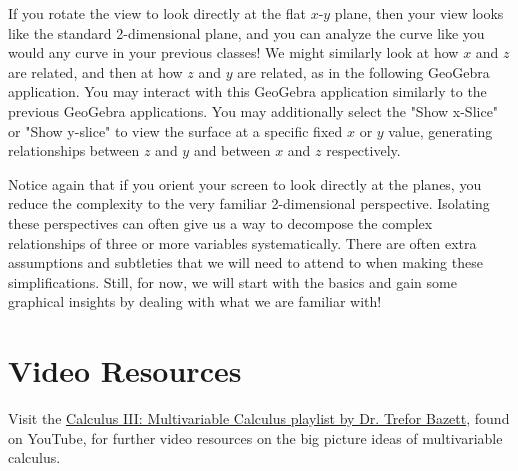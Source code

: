 \documentclass{ximera}
\begin{document}
\begin{center}
\end{center}

If you rotate the view to look directly at the flat $x$-$y$ plane, then your view looks like the standard 2-dimensional plane, and you can analyze the curve like you would any curve in your previous classes! We might similarly look at how $x$ and $z$ are related, and then at how $z$ and $y$ are related, as in the following GeoGebra application. You may interact with this GeoGebra application similarly to the previous GeoGebra applications. You may additionally select the "Show x-Slice" or "Show y-slice" to view the surface at a specific fixed $x$ or $y$ value, generating relationships between $z$ and $y$ and between $x$ and $z$ respectively.

\begin{center}
\end{center}

Notice again that if you orient your screen to look directly at the planes, you reduce the complexity to the very familiar 2-dimensional perspective. Isolating these perspectives can often give us a way to decompose the complex relationships of three or more variables systematically. There are often extra assumptions and subtleties that we will need to attend to when making these simplifications. Still, for now, we will start with the basics and gain some graphical insights by dealing with what we are familiar with!

\section{Video Resources}

Visit the \href{https://www.youtube.com/playlist?list=PLHXZ9OQGMqxc_CvEy7xBKRQr6I214QJcd}{Calculus III: Multivariable Calculus playlist by Dr. Trefor Bazett}, found on YouTube, for further video resources on the big picture ideas of multivariable calculus.
\end{document}
